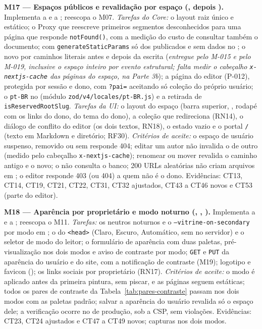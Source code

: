 \textbf{M17 --- Espaços públicos e revalidação por espaço (, depois ).} Implementa a  e a ; reescopa o M07. \emph{Tarefas do Core:} o layout raiz único e estático; o Proxy que reescreve primeiros segmentos desconhecidos para uma página que responde \texttt{notFound()}, com a medição do custo de consultar também o documento; \arq{/[handle]/[...slug]} com \texttt{generateStaticParams} só dos publicados e sem dados no ; o novo  por caminhos literais antes e depois da escrita (\emph{entregue pelo M-015 e pelo M-019, inclusive o espaço inteiro por evento estrutural; falta medir o cabeçalho \texttt{x-nextjs-cache} das páginas do espaço, na Parte 3b}); a página do editor (P-012), protegida por sessão e dono, com \texttt{?pai=} aceitando só coleção do próprio usuário; o \texttt{pt-BR} no  (módulo \texttt{zod/v4/locales/pt-BR.js}) e a retirada de \texttt{isReservedRootSlug}. \emph{Tarefas da UI:} o layout do espaço (barra superior, , rodapé com os links do dono,  do tema do dono), a coleção que redireciona (RN14), o diálogo de conflito do editor (os dois textos, RN18), o estado vazio e o portal \texttt{/} (texto em Markdown e diretório; RF30). \emph{Critérios de aceite:} o espaço de usuário suspenso, removido ou sem  responde 404; editar um autor não invalida o  de outro (medido pelo cabeçalho \texttt{x-nextjs-cache}); renomear ou mover revalida o caminho antigo e o novo; o  não consulta o banco; 200 URLs aleatórias não criam arquivos em ; o editor responde 403 (ou 404) a quem não é o dono. Evidências: CT13, CT14, CT19, CT21, CT22, CT31, CT32 ajustados, CT43 a CT46 novos e CT53 (parte do editor).

\textbf{M18 --- Aparência por proprietário e modo noturno (, , ).} Implementa a  e a ; reescopa o M11. \emph{Tarefas:} os neutros noturnos e o \texttt{--vitrine-on-secondary} por modo em ; o  do \texttt{<head>} (Claro, Escuro, Automático, sem  no servidor) e o seletor de modo do leitor; o formulário de aparência com duas paletas, pré-visualização nos dois modos e aviso de contraste por modo; \texttt{GET} e \texttt{PUT} da aparência do usuário e do site, com a notificação de contraste (M19); logotipo e favicon (); os links sociais por proprietário (RN17). \emph{Critérios de aceite:} o modo é aplicado antes da primeira pintura, sem piscar, e as páginas seguem estáticas; todos os pares de contraste da Tabela~\ref{tab:pares-contraste} passam nos dois modos com as paletas padrão; salvar a aparência do usuário revalida só o espaço dele; a verificação ocorre no  de produção, sob a CSP, sem violações. Evidências: CT23, CT24 ajustados e CT47 a CT49 novos; capturas nos dois modos.


